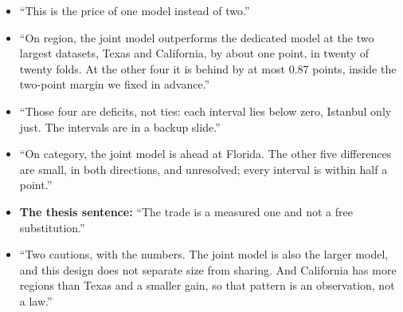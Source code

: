 \say
\begin{itemize}
  \item ``This is the price of one model instead of two.''
  \item ``On region, the joint model outperforms the dedicated model at the two largest datasets, Texas
        and California, by about one point, in twenty of twenty folds. At the other four it is behind by
        at most 0.87 points, inside the two-point margin we fixed in advance.''
  \item ``Those four are deficits, not ties: each interval lies below zero, Istanbul only just. The
        intervals are in a backup slide.''
  \item ``On category, the joint model is ahead at Florida. The other five differences are small, in
        both directions, and unresolved; every interval is within half a point.''
  \item \textbf{The thesis sentence:} ``The trade is a measured one and not a free substitution.''
  \item ``Two cautions, with the numbers. The joint model is also the larger model, and this design
        does not separate size from sharing. And California has more regions than Texas and a smaller
        gain, so that pattern is an observation, not a law.''
\end{itemize}

